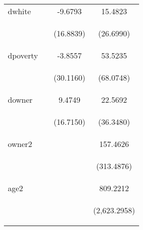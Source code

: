 \begin{center}
\begin{tabular}{lccc}
dwhite &  & -9.6793 & 15.4823 \\
\vspace{4pt} & \begin{footnotesize}\end{footnotesize} & \begin{footnotesize}(16.8839)\end{footnotesize} & \begin{footnotesize}(26.6990)\end{footnotesize} \\
dpoverty &  & -3.8557 & 53.5235 \\
\vspace{4pt} & \begin{footnotesize}\end{footnotesize} & \begin{footnotesize}(30.1160)\end{footnotesize} & \begin{footnotesize}(68.0748)\end{footnotesize} \\
downer &  & 9.4749 & 22.5692 \\
\vspace{4pt} & \begin{footnotesize}\end{footnotesize} & \begin{footnotesize}(16.7150)\end{footnotesize} & \begin{footnotesize}(36.3480)\end{footnotesize} \\
owner2 &  &  & 157.4626 \\
\vspace{4pt} & \begin{footnotesize}\end{footnotesize} & \begin{footnotesize}\end{footnotesize} & \begin{footnotesize}(313.4876)\end{footnotesize} \\
age2 &  &  & 809.2212 \\
\vspace{4pt} & \begin{footnotesize}\end{footnotesize} & \begin{footnotesize}\end{footnotesize} & \begin{footnotesize}(2,623.2958)\end{footnotesize} \\

\end{tabular}
\end{center}
